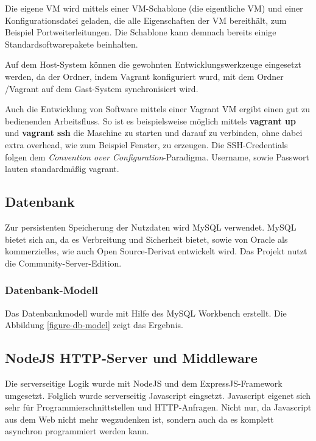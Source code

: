 Die eigene VM wird mittels einer VM-Schablone (die eigentliche VM) und einer Konfigurationsdatei geladen, die alle Eigenschaften der VM bereithält, zum Beispiel Portweiterleitungen. Die Schablone kann demnach bereits einige Standardsoftwarepakete beinhalten. 

Auf dem Host-System können die gewohnten Entwicklungswerkzeuge eingesetzt werden, da der Ordner, indem Vagrant konfiguriert wurd, mit dem Ordner /Vagrant auf dem Gast-System synchronisiert wird. 

Auch die Entwicklung von Software mittels einer Vagrant VM ergibt einen gut zu bedienenden Arbeitsfluss. So ist es beispielsweise möglich mittels \textbf{vagrant up} und \textbf{vagrant ssh} die Maschine zu starten und darauf zu verbinden, ohne dabei extra overhead, wie zum Beispiel Fenster, zu erzeugen. Die SSH-Credentials folgen dem \textit{Convention over Configuration}-Paradigma. Username, sowie Passwort lauten standardmäßig vagrant. 


\subsection{Datenbank}

Zur persistenten Speicherung der Nutzdaten wird MySQL verwendet. MySQL bietet sich an, da es Verbreitung und Sicherheit bietet, sowie von Oracle als kommerzielles, wie auch Open Source-Derivat entwickelt wird. Das Projekt nutzt die Community-Server-Edition. 

\subsubsection{Datenbank-Modell}
Das Datenbankmodell wurde mit Hilfe des MySQL Workbench erstellt. Die Abbildung \ref{figure-db-model} zeigt das Ergebnis.


\subsection{NodeJS HTTP-Server und Middleware}
Die serverseitige Logik wurde mit NodeJS und dem ExpressJS-Framework umgesetzt. Folglich wurde serverseitig Javascript eingsetzt. Javascript eigenet sich sehr für Programmierschnittstellen und HTTP-Anfragen. Nicht nur, da Javascript aus dem Web nicht mehr wegzudenken ist, sondern auch da es komplett asynchron programmiert werden kann. 

